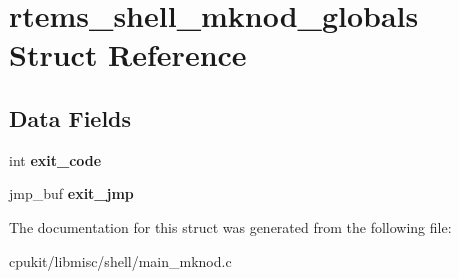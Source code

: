\hypertarget{structrtems__shell__mknod__globals}{}\section{rtems\+\_\+shell\+\_\+mknod\+\_\+globals Struct Reference}
\label{structrtems__shell__mknod__globals}
\subsection*{Data Fields}
\begin{DoxyCompactItemize}
\item 
\mbox{\label{structrtems__shell__mknod__globals_a62730c64d4217866fab191c9d56a4272}} 
int {\bfseries exit\+\_\+code}
\item 
\mbox{\label{structrtems__shell__mknod__globals_aaee3a093871ba44b6d356bac3c58d720}} 
jmp\+\_\+buf {\bfseries exit\+\_\+jmp}
\end{DoxyCompactItemize}


The documentation for this struct was generated from the following file\+:\begin{DoxyCompactItemize}
\item 
cpukit/libmisc/shell/main\+\_\+mknod.\+c\end{DoxyCompactItemize}
